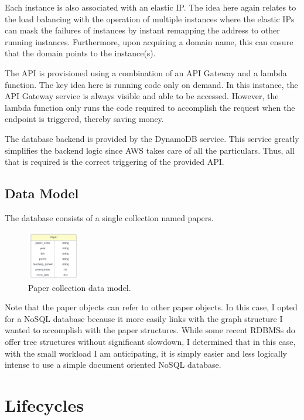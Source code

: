 \documentclass[12pt]{article}
\begin{document}
Each instance is also associated with an elastic IP. The idea here again relates to the load balancing with the operation of multiple instances where the elastic IPs can mask the failures of instances by instant remapping the address to other running instances. Furthermore, upon acquiring a domain name, this can ensure that the domain points to the instance(s).

The API is provisioned using a combination of an API Gateway and a lambda function. The key idea here is running code only on demand. In this instance, the API Gateway service is always visible and able to be accessed. However, the lambda function only runs the code required to accomplish the request when the endpoint is triggered, thereby saving money.   

The database backend is provided by the DynamoDB service. This service greatly simplifies the backend logic since AWS takes care of all the particulars. Thus, all that is required is the correct triggering of the provided API. 

\subsection{Data Model}
The database consists of a single collection named papers.

\begin{figure}
    \caption{Paper collection data model.}
    \label{fig: paper_data_model}
    \begin{center}
        \includegraphics[width=0.2\textwidth]{../docs-assets/paper_erd.PNG}
    \end{center}
\end{figure}

Note that the paper objects can refer to other paper objects. In this case, I opted for a NoSQL database because it more easily links with the graph structure I wanted to accomplish with the paper structures. While some recent RDBMSs do offer tree structures without significant slowdown, I determined that in this case, with the small workload I am anticipating, it is simply easier and less logically intense to use a simple document oriented NoSQL database.

\section{Lifecycles}
\end{document}
